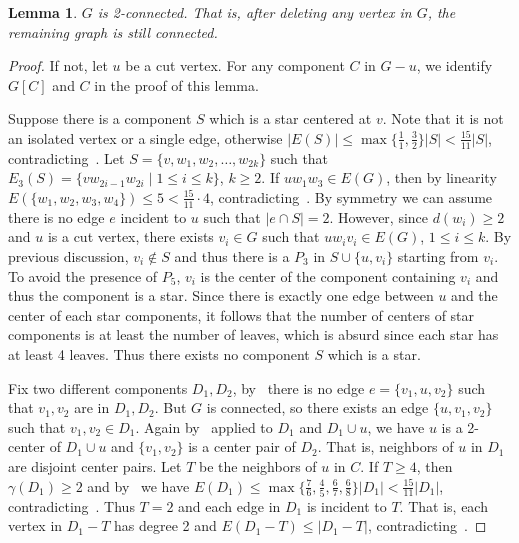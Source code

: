 \documentclass[a4paper]{article}
\newtheorem{lem}[thm]{Lemma}
\begin{document}
\begin{lem}\label{lmcon}
$G$ is 2-connected. That is, after deleting any vertex in $G$, the remaining graph is still connected.
\end{lem}
\begin{proof}
    If not, let $u$ be a cut vertex. For any component $C$ in $G-u$, we identify $G[C]$ and $C$ in the proof of this lemma.

    Suppose there is a component $S$ which is a star centered at $v$. Note that it is not an isolated vertex or a single edge, otherwise $|E(S)|\leq \max\{\frac{1}{1},\frac{3}{2}\}|S|<\frac{15}{11}|S|$, contradicting~. Let $S=\{v,w_1,w_2,\ldots,w_{2k}\}$ such that $E_3(S)=\{vw_{2i-1}w_{2i}\mid 1\leq i \leq k\}$, $k\geq 2$.
    If $uw_1w_3\in E (G)$, then by linearity $E(\{w_1,w_2,w_3,w_4\})\leq 5<\frac{15}{11}\cdot 4$, contradicting~. By symmetry we can assume there is no edge $e$ incident to $u$ such that $|e\cap S|=2$. However, since $d(w_i)\ge 2$ and $u$ is a cut vertex, there exists $v_i\in G$ such that $uw_iv_i\in E (G)$, $1\leq i\leq k$.
    By previous discussion, $v_i\notin S$ and thus there is a $P_3$ in $S\cup \{u,v_i\}$ starting from $v_i$. To avoid the presence of $P_5$, $v_i$ is the center of the component containing $v_i$ and thus the component is a star. Since there is exactly one edge between $u$ and the center of each star components, it follows that the number of centers of star components is at least the number of leaves, which is absurd since each star has at least 4 leaves. Thus there exists no component $S$ which is a star.

    Fix two different components $D_1,D_2$, by~ there is no edge $e=\{v_1,u,v_2\}$ such that $v_1,v_2$ are in $D_1,D_2$. But $G$ is connected, so there exists an edge $\{u,v_1,v_2\}$ such that $v_1,v_2\in D_1$.
    Again by~ applied to $D_1$ and $D_1\cup u$, we have $u$ is a 2-center of $D_1\cup u$ and $\{v_1,v_2\}$ is a center pair of $D_2$. That is, neighbors of $u$ in $D_1$ are disjoint center pairs. Let $T$ be the neighbors of $u$ in $C$. If $T\geq 4$, then $\gamma(D_1)\geq 2$ and by~ we have $E(D_1)\leq \max\{\frac{7}{6},\frac{4}{5},\frac{6}{7},\frac{6}{8}\}|D_1|<\frac{15}{11}|D_1|$, contradicting~. Thus $T=2$ and each edge in $D_1$ is incident to $T$. That is, each vertex in $D_1-T$ has degree 2 and $E(D_1-T)\leq |D_1-T|$, contradicting~.
\end{proof}
\end{document}
